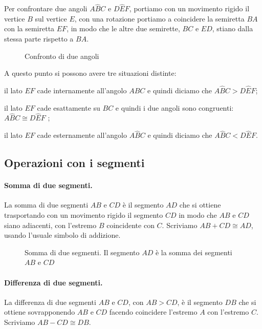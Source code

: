 Per confrontare due angoli $A\widehat{B}C$ e $D\widehat{E}F$, portiamo con un movimento rigido il vertice $B$ sul vertice $E$, con una rotazione portiamo a coincidere la semiretta $BA$ con la semiretta $EF$, in modo che le altre due semirette, $BC$ e $ED$, stiano dalla stessa parte rispetto a $BA$.

\begin{figure}[htb]
\centering
\caption{Confronto di due angoli}
\end{figure}

A questo punto si possono avere tre situazioni distinte:
\begin{itemize*}
\item il lato $EF$ cade internamente all'angolo $A\widehat{B}C$ e quindi diciamo che $A\widehat{B}C>D\widehat{E}F$;
\item il lato $EF$ cade esattamente su $BC$ e quindi i due angoli sono congruenti: $A\widehat{B}C\cong D\widehat{E}F$ ;
\item il lato $EF$ cade esternamente all'angolo $A\widehat{B}C$ e quindi diciamo che $A\widehat{B}C<D\widehat{E}F$.
\end{itemize*}

\subsection{Operazioni con i segmenti}

\paragraph{Somma di due segmenti.} La somma di due segmenti $AB$ e $CD$ è il segmento $AD$ che si ottiene trasportando con un movimento rigido il segmento $CD$ in modo che $AB$ e $CD$ siano adiacenti, con l'estremo $B$ coincidente con $C$. Scriviamo $AB + CD \cong AD$, usando l'usuale simbolo di addizione.

\begin{figure}[htb]
\centering
\caption{Somma di due segmenti. Il segmento $AD$ è la somma dei segmenti $AB$ e $CD$}
\end{figure}

\paragraph{Differenza di due segmenti.} La differenza di due segmenti $AB$ e $CD$, con $AB>CD$, è il segmento $DB$ che si ottiene sovrapponendo $AB$ e $CD$ facendo coincidere l'estremo $A$ con l'estremo $C$. Scriviamo $AB-CD \cong DB$.

